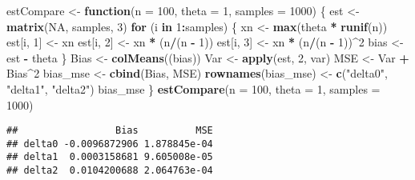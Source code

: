 \documentclass[12pt,]{article}
\newenvironment{Shaded}{\begin{snugshade}}{\end{snugshade}}
\newcommand{\ControlFlowTok}[1]{\textcolor[rgb]{0.13,0.29,0.53}{\textbf{#1}}}
\newcommand{\DataTypeTok}[1]{\textcolor[rgb]{0.13,0.29,0.53}{#1}}
\newcommand{\DecValTok}[1]{\textcolor[rgb]{0.00,0.00,0.81}{#1}}
\newcommand{\KeywordTok}[1]{\textcolor[rgb]{0.13,0.29,0.53}{\textbf{#1}}}
\newcommand{\NormalTok}[1]{#1}
\newcommand{\OperatorTok}[1]{\textcolor[rgb]{0.81,0.36,0.00}{\textbf{#1}}}
\newcommand{\OtherTok}[1]{\textcolor[rgb]{0.56,0.35,0.01}{#1}}
\newcommand{\StringTok}[1]{\textcolor[rgb]{0.31,0.60,0.02}{#1}}
\begin{document}
\begin{Shaded}
\begin{Highlighting}[]
\NormalTok{estCompare <-}\StringTok{ }\ControlFlowTok{function}\NormalTok{(}\DataTypeTok{n =} \DecValTok{100}\NormalTok{, }\DataTypeTok{theta =} \DecValTok{1}\NormalTok{, }\DataTypeTok{samples =} \DecValTok{1000}\NormalTok{) \{}
\NormalTok{    est <-}\StringTok{ }\KeywordTok{matrix}\NormalTok{(}\OtherTok{NA}\NormalTok{, samples, }\DecValTok{3}\NormalTok{)}
    \ControlFlowTok{for}\NormalTok{ (i }\ControlFlowTok{in} \DecValTok{1}\OperatorTok{:}\NormalTok{samples) \{}
\NormalTok{        xn <-}\StringTok{ }\KeywordTok{max}\NormalTok{(theta }\OperatorTok{*}\StringTok{ }\KeywordTok{runif}\NormalTok{(n))}
\NormalTok{        est[i, }\DecValTok{1}\NormalTok{] <-}\StringTok{ }\NormalTok{xn}
\NormalTok{        est[i, }\DecValTok{2}\NormalTok{] <-}\StringTok{ }\NormalTok{xn }\OperatorTok{*}\StringTok{ }\NormalTok{(n}\OperatorTok{/}\NormalTok{(n }\OperatorTok{-}\StringTok{ }\DecValTok{1}\NormalTok{))}
\NormalTok{        est[i, }\DecValTok{3}\NormalTok{] <-}\StringTok{ }\NormalTok{xn }\OperatorTok{*}\StringTok{ }\NormalTok{(n}\OperatorTok{/}\NormalTok{(n }\OperatorTok{-}\StringTok{ }\DecValTok{1}\NormalTok{))}\OperatorTok{^}\DecValTok{2}
\NormalTok{        bias <-}\StringTok{ }\NormalTok{est }\OperatorTok{-}\StringTok{ }\NormalTok{theta}
\NormalTok{    \}}
\NormalTok{    Bias <-}\StringTok{ }\KeywordTok{colMeans}\NormalTok{((bias))}
\NormalTok{    Var <-}\StringTok{ }\KeywordTok{apply}\NormalTok{(est, }\DecValTok{2}\NormalTok{, var)}
\NormalTok{    MSE <-}\StringTok{ }\NormalTok{Var }\OperatorTok{+}\StringTok{ }\NormalTok{Bias}\OperatorTok{^}\DecValTok{2}
\NormalTok{    bias_mse <-}\StringTok{ }\KeywordTok{cbind}\NormalTok{(Bias, MSE)}
    \KeywordTok{rownames}\NormalTok{(bias_mse) <-}\StringTok{ }\KeywordTok{c}\NormalTok{(}\StringTok{"delta0"}\NormalTok{, }\StringTok{"delta1"}\NormalTok{, }\StringTok{"delta2"}\NormalTok{)}
\NormalTok{    bias_mse}
\NormalTok{\}}
\KeywordTok{estCompare}\NormalTok{(}\DataTypeTok{n =} \DecValTok{100}\NormalTok{, }\DataTypeTok{theta =} \DecValTok{1}\NormalTok{, }\DataTypeTok{samples =} \DecValTok{1000}\NormalTok{)}
\end{Highlighting}
\end{Shaded}

\begin{verbatim}
##                 Bias          MSE
## delta0 -0.0096872906 1.878845e-04
## delta1  0.0003158681 9.605008e-05
## delta2  0.0104200688 2.064763e-04
\end{verbatim}
\end{document}
